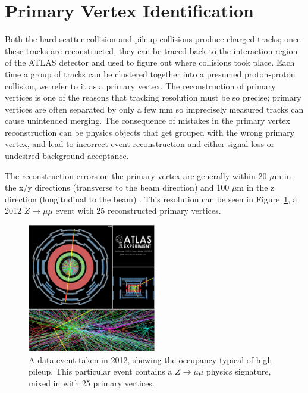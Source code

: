 \section{Primary Vertex Identification}
\label{sec:pv}
Both the hard scatter collision and pileup collisions produce charged tracks; once these tracks are reconstructed, they can 
be traced back to the interaction region of the ATLAS detector and used to figure out where collisions took place.  
Each time a group of tracks can be clustered together into a presumed proton-proton collision, we refer to it 
as a primary vertex.  The reconstruction of primary vertices is one of the reasons that tracking resolution must be 
so precise; primary vertices are often separated by only a few mm so imprecisely measured tracks can cause unintended 
merging.  The consequence of mistakes in the primary vertex reconstruction can be physics objects that get grouped with the 
wrong primary vertex, and lead to incorrect event reconstruction and either signal loss or undesired background acceptance.

The reconstruction errors on the primary vertex are generally within 20 $\mu$m in the x/y directions 
(transverse to the beam direction) and 100 $\mu$m in the z direction (longitudinal to the  
beam) \cite{pileup_tracks}.   This resolution can be seen in Figure~\ref{fig:pileup_pv}, a 2012 
$Z\rightarrow\mu\mu$ event with 25 reconstructed primary vertices.



\begin{figure}
    \center
	\includegraphics[width=0.5\textwidth]{ReconstructionPerformance/images/2012_highPileup.pdf}
	\caption{A data event taken in 2012, showing the occupancy typical of high pileup.  This particular event contains a $Z\rightarrow \mu\mu$ physics signature, mixed in with 25 primary vertices.	\label{fig:pileup_pv}  }
\end{figure}


